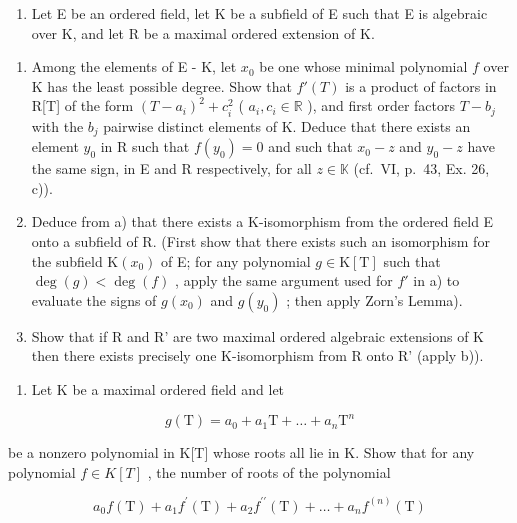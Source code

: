 \begin{enumerate}
\def\labelenumi{\arabic{enumi})}
\setcounter{enumi}{14}
\tightlist
\item
  Let E be an ordered field, let K be a subfield of E such that E is algebraic over K, and let R be a maximal ordered extension of K.
\end{enumerate}

\begin{enumerate}
\def\labelenumi{\alph{enumi})}
\item
  Among the elements of E - K, let \(x_0\) be one whose minimal polynomial \(f\) over K has the least possible degree. Show that \(f'(T)\) is a product of factors in R{[}T{]} of the form \((T - a_i)^2 + c_i^2\) ( \(a_i, c_i \in \mathbb{R}\) ), and first order factors \(T - b_j\) with the \(b_j\) pairwise distinct elements of K. Deduce that there exists an element \(y_0\) in R such that \(f(y_0) = 0\) and such that \(x_0 - z\) and \(y_0 - z\) have the same sign, in E and R respectively, for all \(z \in \mathbb{K}\) (cf.~VI, p.~43, Ex. 26, c)).
\item
  Deduce from a) that there exists a K-isomorphism from the ordered field E onto a subfield of R. (First show that there exists such an isomorphism for the subfield \(\mathrm{K}(x_{0})\) of E; for any polynomial \(g \in \mathrm{K}[\mathrm{T}]\) such that \(\deg(g) < \deg(f)\) , apply the same argument used for \(f'\) in a) to evaluate the signs of \(g(x_{0})\) and \(g(y_{0})\) ; then apply Zorn's Lemma).
\item
  Show that if R and R' are two maximal ordered algebraic extensions of K then there exists precisely one K-isomorphism from R onto R' (apply b)).
\end{enumerate}

\begin{enumerate}
\def\labelenumi{\arabic{enumi})}
\setcounter{enumi}{15}
\tightlist
\item
  Let K be a maximal ordered field and let
\end{enumerate}

\[
g (\mathrm{T}) = a _ {0} + a _ {1} \mathrm{T} + \dots + a _ {n} \mathrm{T} ^ {n}
\]

be a nonzero polynomial in K{[}T{]} whose roots all lie in K. Show that for any polynomial \(f \in K[T]\) , the number of roots of the polynomial

\[
a _ {0} f (\mathrm{T}) + a _ {1} f ^ {\prime} (\mathrm{T}) + a _ {2} f ^ {\prime \prime} (\mathrm{T}) + \dots + a _ {n} f ^ {(n)} (\mathrm{T})
\]

